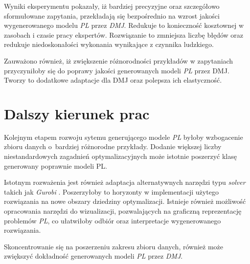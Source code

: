 Wyniki eksperymentu pokazały, iż bardziej precyzyjne oraz szczegółowo sformułowane zapytania, przekładają się bezpośrednio na wzrost jakości wygenerowanego modelu \textit{PL} przez \textit{DMJ}. Redukuje to konieczność kosztownej w zasobach i czasie pracy ekspertów. Rozwiązanie to zmniejsza liczbę błędów oraz redukuje niedoskonałości wykonania wynikające z czynnika ludzkiego. 

Zauważono również, iż zwiększenie różnorodności przykładów w zapytaniach przyczyniłoby się do poprawy jakości generowanych modeli \textit{PL} przez DMJ. Tworzy to dodatkowe adaptacje dla DMJ oraz polepsza ich elastyczność. %

\section{Dalszy kierunek prac}

Kolejnym etapem rozwoju sytemu generującego modele \textit{PL} byłoby wzbogacenie zbioru danych o~bardziej różnorodne przykłady. Dodanie większej liczby niestandardowych zagadnień optymalizacyjnych może istotnie poszerzyć klasę generowany poprawnie modeli PL.

Istotnym rozważenia jest również adaptacja alternatywnych narzędzi typu \textit{solver} takich jak \textit{Gurobi} \cite{TODO}. Poszerzyłoby to horyzonty w implementacji użytego rozwiązania na nowe obszary dziedziny optymalizacji. Istnieje również możliwość opracowania narzędzi do wizualizacji, pozwalających na graficzną reprezentację problemów \textit{PL}, co ułatwiłoby odbiór oraz interpretacje wygenerowanego rozwiązania. 

Skoncentrowanie się na poszerzeniu zakresu zbioru danych, również może zwiększyć dokładność generowanych modeli \textit{PL} przez \textit{DMJ}. 